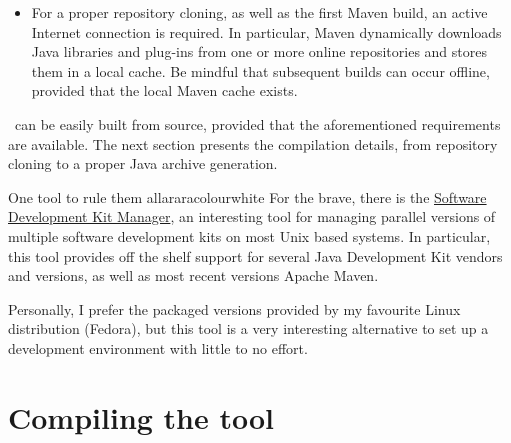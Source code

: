 \begin{itemize}[label={}]

Please refer to the Maven \href{https://maven.apache.org/}{project website} in order to obtain specific installation instructions for your operating system. In general, most recent Linux distributions have the Maven binary, as well the proper associated dependencies, available in their corresponding repositories.

\item For a proper repository cloning, as well as the first Maven build, an active Internet connection is required. In particular, Maven dynamically downloads Java libraries and plug-ins from one or more online repositories and stores them in a local cache. Be mindful that subsequent builds can occur offline, provided that the local Maven cache exists.
\end{itemize}

\arara\ can be easily built from source, provided that the aforementioned requirements are available. The next section presents the compilation details, from repository cloning to a proper Java archive generation.

\begin{messagebox}{One tool to rule them all}{araracolour}{\icok}{white}
\setlength{\parskip}{1em}
For the brave, there is the \href{https://sdkman.io/}{Software Development Kit Manager}, an interesting tool for managing parallel versions of multiple software development kits on most Unix based systems. In particular, this tool provides off the shelf support for several Java Development Kit vendors and versions, as well as most recent versions Apache Maven.

Personally, I prefer the packaged versions provided by my favourite Linux distribution (Fedora), but this tool is a very interesting alternative to set up a development environment with little to no effort.
\end{messagebox}

\section{Compiling the tool}
\label{sec:compilingthetool}

